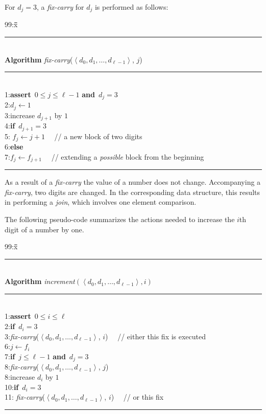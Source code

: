 \documentclass{llncs}
\newenvironment{algorithm}{\par\vspace*{-2mm}\quad\begin{minipage}[t]{0.925\textwidth}\begin{tabbing}99:x\=\quad\=\quad\=\quad\=\quad\=\quad\=\kill}{\end{tabbing}\end{minipage}\par\vspace*{-3mm}}
\newcommand{\ASSERT}{\textbf{assert}\ }
\newcommand{\IF}{\textbf{if}\ }
\newcommand{\ELSE}{\textbf{else}\ }
\newcommand{\AND}{\textbf{and}\ }
\newcommand{\sequence}[1]{\left\langle#1\right\rangle}
\begin{document}
For $d_j=3$, a \emph{fix-carry} for $d_j$ is performed as follows: 
\begin{center}
\begin{algorithm}
\rule[6pt]{\textwidth}{0.45pt}\\[-6pt]
\textbf{Algorithm} \textit{fix-carry}($\sequence{d_0,d_1,\ldots,d_{\ell-1}}$, $j$)\\
\rule[6pt]{\textwidth}{0.45pt}\\[-6pt]
1:\>\ASSERT $0 \leq j \leq \ell-1$ \AND $d_j=3$\\
2:\>$d_j \leftarrow 1$\\
3:\>increase $d_{j+1}$ by $1$\\
4:\>\IF $d_{j+1} = 3$\\ 
5:\>\> $f_j \leftarrow j+1$ ~~// a new block of two digits\\
6:\>\ELSE\\
7:\>\>$f_j \leftarrow f_{j+1}$ ~~// extending a \emph{possible} block from the beginning\\ 
\rule[6pt]{\textwidth}{0.45pt}
\end{algorithm}
\end{center}
As a result of a {\it fix-carry} the value of a number does not change.
Accompanying a {\it fix-carry}, two digits are changed. In the corresponding
data structure, this results in performing a \emph{join}, which
involves one element comparison.

The following pseudo-code summarizes the actions needed to increase
the $i$th digit of a number by one.

\begin{center}
\begin{algorithm}
\rule[6pt]{\textwidth}{0.45pt}\\[-6pt]
\textbf{Algorithm} \textit{increment}$(\sequence{d_0,d_1,\ldots,d_{\ell-1}}, i)$\\
\rule[6pt]{\textwidth}{0.45pt}\\[-6pt]
1:\>\ASSERT $0 \leq i \leq \ell$\\
2:\>\IF $d_i = 3$\\
3:\>\>\textit{fix-carry}($\sequence{d_0,d_1,\ldots,d_{\ell-1}}$, $i$)
~~// either this fix is executed\\
6:\>$j \leftarrow f_i$\\
7:\>\IF $j \leq \ell-1$ \AND $d_j = 3$\\
8:\>\>\textit{fix-carry}($\sequence{d_0,d_1,\ldots,d_{\ell-1}}$, $j$)\\
8:\>increase $d_i$ by $1$\\
10:\>\IF $d_i = 3$\\
11:\>\> \textit{fix-carry}($\sequence{d_0,d_1,\ldots,d_{\ell-1}}$,
$i$) ~~// or this fix\\
\rule[6pt]{\textwidth}{0.45pt}
\end{algorithm}
\end{center}
\end{document}

